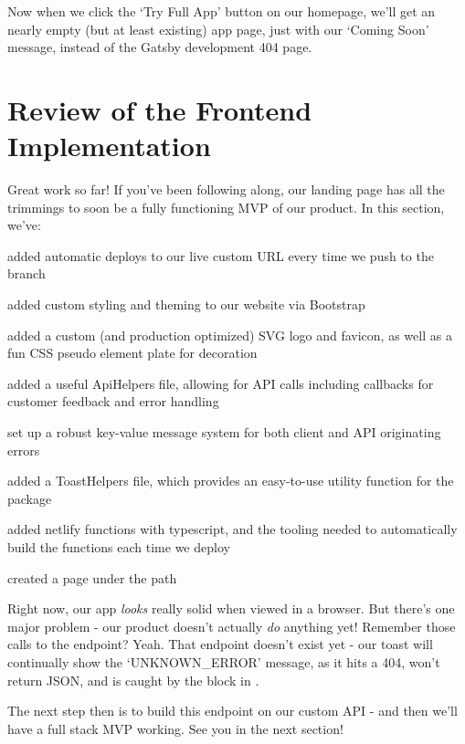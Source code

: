 \documentclass[paper=6in:9in,pagesize=pdftex,headinclude=on,footinclude=on,12pt,twoside]{scrbook}
\begin{document}
Now when we click the `Try Full App' button on our homepage, we'll get an nearly empty (but at least existing) app page, just with our `Coming Soon' message, instead of the Gatsby development 404 page.

\section{Review of the Frontend Implementation}

Great work so far! If you've been following along, our landing page has all the trimmings to soon be a fully functioning MVP of our product. In this section, we've: 

\begin{arrows}
\item added automatic deploys to our live custom URL every time we push to the  branch
\item added custom styling and theming to our website via Bootstrap
\item added a custom (and production optimized) SVG logo and favicon, as well as a fun CSS pseudo element plate for decoration
\item added a useful ApiHelpers file, allowing for API calls including callbacks for customer feedback and error handling
\item set up a robust key-value message system for both client and API originating errors
\item added a ToastHelpers file, which provides an easy-to-use utility function for the  package
\item added netlify functions with typescript, and the tooling needed to automatically build the functions each time we deploy
\item created a page under the  path
\end{arrows}

Right now, our app \textit{looks} really solid when viewed in a browser. But there's one major problem - our product doesn't actually \textit{do} anything yet! \joy Remember those calls to the  endpoint? Yeah. That endpoint doesn't exist yet - our toast will continually show the `UNKNOWN\_ERROR' message, as it hits a 404, won't return JSON, and is caught by the  block in .

The next step then is to build this  endpoint on our custom API - and then we'll have a full stack MVP working. See you in the next section!
\end{document}
